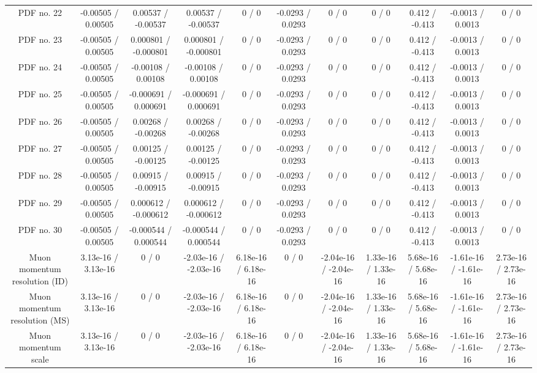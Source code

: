 \begin{table}[htbp]
\begin{center}
\begin{tabular}{|c|c|c|c|c|c|c|c|c|c|c|}
  PDF no. 22 & -0.00505 / 0.00505 & 0.00537 / -0.00537 & 0.00537 / -0.00537 & 0 / 0 & -0.0293 / 0.0293 & 0 / 0 & 0 / 0 & 0.412 / -0.413 & -0.0013 / 0.0013 & 0 / 0 \\ 
  PDF no. 23 & -0.00505 / 0.00505 & 0.000801 / -0.000801 & 0.000801 / -0.000801 & 0 / 0 & -0.0293 / 0.0293 & 0 / 0 & 0 / 0 & 0.412 / -0.413 & -0.0013 / 0.0013 & 0 / 0 \\ 
  PDF no. 24 & -0.00505 / 0.00505 & -0.00108 / 0.00108 & -0.00108 / 0.00108 & 0 / 0 & -0.0293 / 0.0293 & 0 / 0 & 0 / 0 & 0.412 / -0.413 & -0.0013 / 0.0013 & 0 / 0 \\ 
  PDF no. 25 & -0.00505 / 0.00505 & -0.000691 / 0.000691 & -0.000691 / 0.000691 & 0 / 0 & -0.0293 / 0.0293 & 0 / 0 & 0 / 0 & 0.412 / -0.413 & -0.0013 / 0.0013 & 0 / 0 \\ 
  PDF no. 26 & -0.00505 / 0.00505 & 0.00268 / -0.00268 & 0.00268 / -0.00268 & 0 / 0 & -0.0293 / 0.0293 & 0 / 0 & 0 / 0 & 0.412 / -0.413 & -0.0013 / 0.0013 & 0 / 0 \\ 
  PDF no. 27 & -0.00505 / 0.00505 & 0.00125 / -0.00125 & 0.00125 / -0.00125 & 0 / 0 & -0.0293 / 0.0293 & 0 / 0 & 0 / 0 & 0.412 / -0.413 & -0.0013 / 0.0013 & 0 / 0 \\ 
  PDF no. 28 & -0.00505 / 0.00505 & 0.00915 / -0.00915 & 0.00915 / -0.00915 & 0 / 0 & -0.0293 / 0.0293 & 0 / 0 & 0 / 0 & 0.412 / -0.413 & -0.0013 / 0.0013 & 0 / 0 \\ 
  PDF no. 29 & -0.00505 / 0.00505 & 0.000612 / -0.000612 & 0.000612 / -0.000612 & 0 / 0 & -0.0293 / 0.0293 & 0 / 0 & 0 / 0 & 0.412 / -0.413 & -0.0013 / 0.0013 & 0 / 0 \\ 
  PDF no. 30 & -0.00505 / 0.00505 & -0.000544 / 0.000544 & -0.000544 / 0.000544 & 0 / 0 & -0.0293 / 0.0293 & 0 / 0 & 0 / 0 & 0.412 / -0.413 & -0.0013 / 0.0013 & 0 / 0 \\ 
  Muon momentum resolution (ID) & 3.13e-16 / 3.13e-16 & 0 / 0 & -2.03e-16 / -2.03e-16 & 6.18e-16 / 6.18e-16 & 0 / 0 & -2.04e-16 / -2.04e-16 & 1.33e-16 / 1.33e-16 & 5.68e-16 / 5.68e-16 & -1.61e-16 / -1.61e-16 & 2.73e-16 / 2.73e-16 \\ 
  Muon momentum resolution (MS) & 3.13e-16 / 3.13e-16 & 0 / 0 & -2.03e-16 / -2.03e-16 & 6.18e-16 / 6.18e-16 & 0 / 0 & -2.04e-16 / -2.04e-16 & 1.33e-16 / 1.33e-16 & 5.68e-16 / 5.68e-16 & -1.61e-16 / -1.61e-16 & 2.73e-16 / 2.73e-16 \\ 
  Muon momentum scale & 3.13e-16 / 3.13e-16 & 0 / 0 & -2.03e-16 / -2.03e-16 & 6.18e-16 / 6.18e-16 & 0 / 0 & -2.04e-16 / -2.04e-16 & 1.33e-16 / 1.33e-16 & 5.68e-16 / 5.68e-16 & -1.61e-16 / -1.61e-16 & 2.73e-16 / 2.73e-16 \\ 

\end{tabular}
\end{center}
\end{table}
